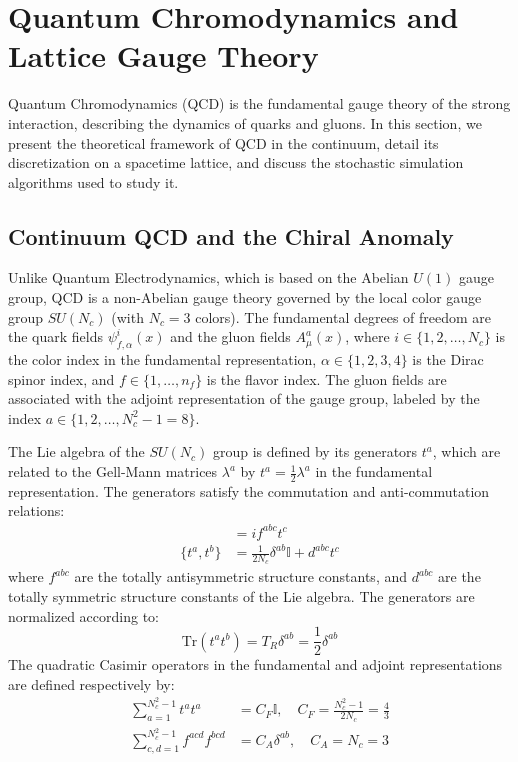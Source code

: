 
\section{Quantum Chromodynamics and Lattice Gauge Theory}
\label{sec:lattice_qcd}

Quantum Chromodynamics (QCD) is the fundamental gauge theory of the strong interaction, describing the dynamics of quarks and gluons. In this section, we present the theoretical framework of QCD in the continuum, detail its discretization on a spacetime lattice, and discuss the stochastic simulation algorithms used to study it.\cite{gelis2019quantum,zeidlerQuantumFieldTheory2009a,glimmQuantumPhysics1987,rothe2012lattice}

\subsection{Continuum QCD and the Chiral Anomaly}
Unlike Quantum Electrodynamics, which is based on the Abelian $U(1)$ gauge group, QCD is a non-Abelian gauge theory governed by the local color gauge group $SU(N_c)$ (with $N_c = 3$ colors). The fundamental degrees of freedom are the quark fields $\psi_{f, \alpha}^i(x)$ and the gluon fields $A_\mu^a(x)$, where $i \in \{1, 2, \dots, N_c\}$ is the color index in the fundamental representation, $\alpha \in \{1, 2, 3, 4\}$ is the Dirac spinor index, and $f \in \{1, \dots, n_f\}$ is the flavor index. The gluon fields are associated with the adjoint representation of the gauge group, labeled by the index $a \in \{1, 2, \dots, N_c^2 - 1 = 8\}$.

The Lie algebra of the $SU(N_c)$ group is defined by its generators $t^a$, which are related to the Gell-Mann matrices $\lambda^a$ by $t^a = \frac{1}{2} \lambda^a$ in the fundamental representation. The generators satisfy the commutation and anti-commutation relations:
\begin{align}
[t^a, t^b] &= i f^{abc} t^c \\
\{t^a, t^b\} &= \frac{1}{2N_c} \delta^{ab} \mathbb{I} + d^{abc} t^c
\end{align}
where $f^{abc}$ are the totally antisymmetric structure constants, and $d^{abc}$ are the totally symmetric structure constants of the Lie algebra. The generators are normalized according to:
\begin{equation}
\mathrm{Tr}\left(t^a t^b\right) = T_R \delta^{ab} = \frac{1}{2} \delta^{ab}
\end{equation}
The quadratic Casimir operators in the fundamental and adjoint representations are defined respectively by:
\begin{align}
\sum_{a=1}^{N_c^2-1} t^a t^a &= C_F \mathbb{I}, \quad C_F = \frac{N_c^2 - 1}{2N_c} = \frac{4}{3} \\
\sum_{c,d=1}^{N_c^2-1} f^{acd} f^{bcd} &= C_A \delta^{ab}, \quad C_A = N_c = 3
\end{align}

